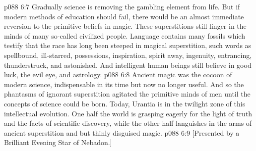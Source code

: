\vs p088 6:7 Gradually science is removing the gambling element from life. But if modern methods of education should fail, there would be an almost immediate reversion to the primitive beliefs in magic. These superstitions still linger in the minds of many so\hyp{}called civilized people. Language contains many fossils which testify that the race has long been steeped in magical superstition, such words as spellbound, ill\hyp{}starred, possessions, inspiration, spirit away, ingenuity, entrancing, thunderstruck, and astonished. And intelligent human beings still believe in good luck, the evil eye, and astrology.
\vs p088 6:8 Ancient magic was the cocoon of modern science, indispensable in its time but now no longer useful. And so the phantasms of ignorant superstition agitated the primitive minds of men until the concepts of science could be born. Today, Urantia is in the twilight zone of this intellectual evolution. One half the world is grasping eagerly for the light of truth and the facts of scientific discovery, while the other half languishes in the arms of ancient superstition and but thinly disguised magic.
\vsetoff
\vs p088 6:9 [Presented by a Brilliant Evening Star of Nebadon.]
